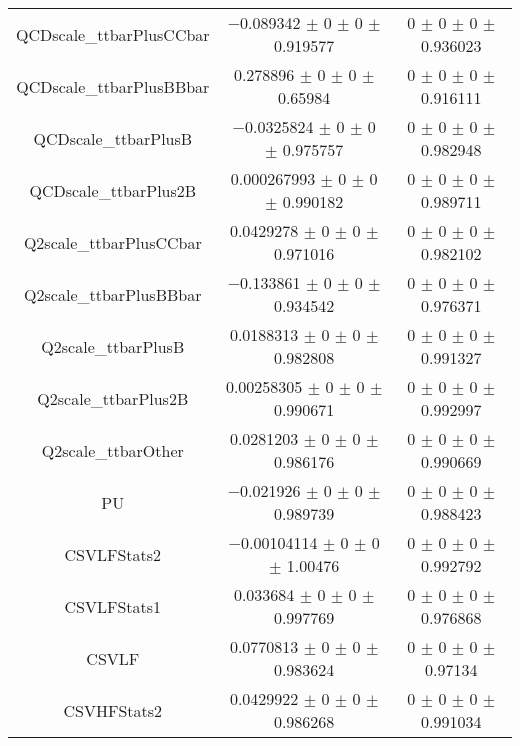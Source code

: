 \begin{table}
\begin{tabular}{ccc}
QCDscale\_ttbarPlusCCbar & \num{-0.089342} $\pm$ \num{0} $\pm$ \num{0} $\pm$ \num{0.919577} & \num{0} $\pm$ \num{0} $\pm$ \num{0} $\pm$ \num{0.936023}\\
QCDscale\_ttbarPlusBBbar & \num{0.278896} $\pm$ \num{0} $\pm$ \num{0} $\pm$ \num{0.65984} & \num{0} $\pm$ \num{0} $\pm$ \num{0} $\pm$ \num{0.916111}\\
QCDscale\_ttbarPlusB & \num{-0.0325824} $\pm$ \num{0} $\pm$ \num{0} $\pm$ \num{0.975757} & \num{0} $\pm$ \num{0} $\pm$ \num{0} $\pm$ \num{0.982948}\\
QCDscale\_ttbarPlus2B & \num{0.000267993} $\pm$ \num{0} $\pm$ \num{0} $\pm$ \num{0.990182} & \num{0} $\pm$ \num{0} $\pm$ \num{0} $\pm$ \num{0.989711}\\
Q2scale\_ttbarPlusCCbar & \num{0.0429278} $\pm$ \num{0} $\pm$ \num{0} $\pm$ \num{0.971016} & \num{0} $\pm$ \num{0} $\pm$ \num{0} $\pm$ \num{0.982102}\\
Q2scale\_ttbarPlusBBbar & \num{-0.133861} $\pm$ \num{0} $\pm$ \num{0} $\pm$ \num{0.934542} & \num{0} $\pm$ \num{0} $\pm$ \num{0} $\pm$ \num{0.976371}\\
Q2scale\_ttbarPlusB & \num{0.0188313} $\pm$ \num{0} $\pm$ \num{0} $\pm$ \num{0.982808} & \num{0} $\pm$ \num{0} $\pm$ \num{0} $\pm$ \num{0.991327}\\
Q2scale\_ttbarPlus2B & \num{0.00258305} $\pm$ \num{0} $\pm$ \num{0} $\pm$ \num{0.990671} & \num{0} $\pm$ \num{0} $\pm$ \num{0} $\pm$ \num{0.992997}\\
Q2scale\_ttbarOther & \num{0.0281203} $\pm$ \num{0} $\pm$ \num{0} $\pm$ \num{0.986176} & \num{0} $\pm$ \num{0} $\pm$ \num{0} $\pm$ \num{0.990669}\\
PU & \num{-0.021926} $\pm$ \num{0} $\pm$ \num{0} $\pm$ \num{0.989739} & \num{0} $\pm$ \num{0} $\pm$ \num{0} $\pm$ \num{0.988423}\\
CSVLFStats2 & \num{-0.00104114} $\pm$ \num{0} $\pm$ \num{0} $\pm$ \num{1.00476} & \num{0} $\pm$ \num{0} $\pm$ \num{0} $\pm$ \num{0.992792}\\
CSVLFStats1 & \num{0.033684} $\pm$ \num{0} $\pm$ \num{0} $\pm$ \num{0.997769} & \num{0} $\pm$ \num{0} $\pm$ \num{0} $\pm$ \num{0.976868}\\
CSVLF & \num{0.0770813} $\pm$ \num{0} $\pm$ \num{0} $\pm$ \num{0.983624} & \num{0} $\pm$ \num{0} $\pm$ \num{0} $\pm$ \num{0.97134}\\
CSVHFStats2 & \num{0.0429922} $\pm$ \num{0} $\pm$ \num{0} $\pm$ \num{0.986268} & \num{0} $\pm$ \num{0} $\pm$ \num{0} $\pm$ \num{0.991034}\\

\end{tabular}
\end{table}
